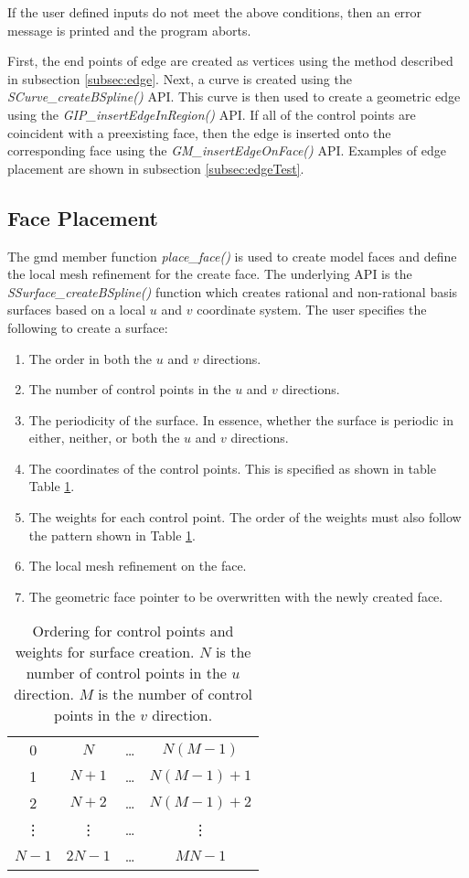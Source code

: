 \documentclass[a4paper, 12pt]{article}
\begin{document}
If the user defined inputs do not meet the above conditions, then an error 
message is printed and the program aborts.

First, the end points of edge are created as vertices using the 
method described in subsection \ref{subsec:edge}. Next, a curve
is created using the \emph{SCurve\_createBSpline()} API. This 
curve is then used to create a geometric edge using the 
\emph{GIP\_insertEdgeInRegion()} API. If all of the 
control points are coincident with a preexisting face, then the
edge is inserted onto the corresponding face using the 
\emph{GM\_insertEdgeOnFace()} API. Examples of edge placement
are shown in subsection \ref{subsec:edgeTest}.

\subsection{Face Placement} \label{subsec:face}
The gmd member function \emph{place\_face()} is used to create model 
faces and define the local mesh refinement for the create face. The
underlying API is the \emph{SSurface\_createBSpline()} function which creates 
rational and non-rational basis surfaces based on a local $u$ and $v$ 
coordinate system.  The user specifies the following to create a surface:
\begin{enumerate}
  \item The order in both the $u$ and $v$ directions.
  \item The number of control points in the $u$ and $v$ directions.
  \item The periodicity of the surface. In essence, whether the 
      surface is periodic in either, neither, or both the $u$ and $v$ directions.
  \item The coordinates of the control points. This is specified as shown in table
      Table \ref{table:cpNum}.
  \item The weights for each control point. The order of the weights must
      also follow the pattern shown in Table \ref{table:cpNum}.
  \item The local mesh refinement on the face. 
  \item The geometric face pointer to be overwritten with the newly created face.
\end{enumerate}

\begin{table}[H]
  \centering
  \begin{tabular}{ c c c c}
    0        & $N$     & \dots  & $N(M-1)$   \\
    1        & $N+1$   & \dots  & $N(M-1)+1$ \\
    2        & $N+2$   & \dots  & $N(M-1)+2$ \\
    \vdots   & \vdots  & \dots  & \vdots     \\
    $N-1$    & $2N-1$  & \dots  & $MN-1$     \\

  \end{tabular}
  \caption{Ordering for control points and weights for surface creation. $N$ is 
    the number of control points in the $u$ direction. $M$ is the number of
    control points in the $v$ direction.}
  \label{table:cpNum}
\end{table}
\end{document}
